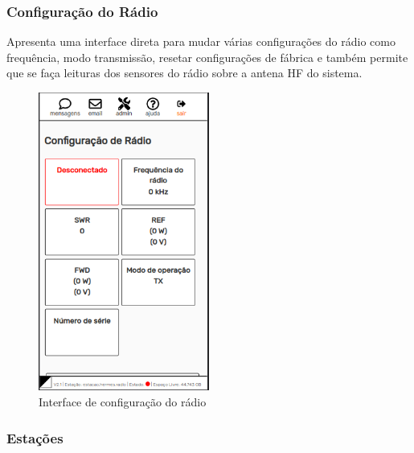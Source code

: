 \documentclass[11pt,a4paper]{article}
\begin{document}
    
\subsubsection{Configuração do Rádio}
\label{gui_radio_config}

Apresenta uma interface direta para mudar várias configurações do rádio como frequência, modo transmissão, resetar configurações de fábrica e também permite que se faça leituras dos sensores do rádio sobre a antena HF do sistema.



\begin{figure}[H]
    \centering
    \includegraphics[width=0.5\textwidth]{screenshots/frontend/pt_kn/radioconfig.png}
    \caption{Interface de configuração do rádio}
	\vspace{-10pt}
    \label{fig:radioconf}
\end{figure}    


\subsubsection{Estações} 
\label{gui_stations}
\end{document}
